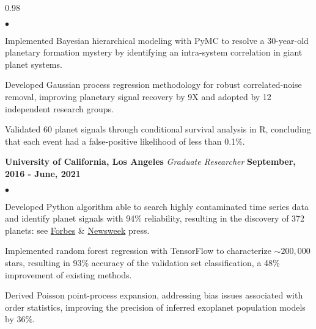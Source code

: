 \documentclass[margin,line, 12pt]{res}
\newenvironment{list2}{
  \begin{list}{$\bullet$}{%
      \setlength{\itemsep}{0.04in}
      \setlength{\parsep}{0.00in} \setlength{\parskip}{0in}
      \setlength{\topsep}{0.0in} \setlength{\partopsep}{0in}
      \setlength{\leftmargin}{0.2in}}}{\end{list}}
\begin{document}
\begin{spacing}{0.98}
\begin{resume}
\begin{list2}
	\item Implemented Bayesian hierarchical modeling with PyMC to resolve a 30-year-old planetary formation mystery by identifying an intra-system correlation in giant planet systems.
	
	\item Developed Gaussian process regression methodology for robust correlated-noise removal, improving planetary signal recovery by 9X and adopted by 12 independent research groups.
	
	\item Validated 60 planet signals through conditional survival analysis in R, concluding that each event had a false-positive likelihood of less than 0.1\%.
	
	


	
	\end{list2}		

\vspace*{-0.08in}
\textbf{University of California, Los Angeles} \newline
\textit{Graduate Researcher} \hfill \textbf{September, 2016 - June, 2021}\newline
	\begin{list2}
		\vspace*{-5mm}
	\item Developed Python algorithm able to search highly contaminated time series data and identify planet signals with 94\% reliability, resulting in the discovery of 372 planets: see \href{https://www.forbes.com/sites/jamiecartereurope/2021/06/11/we-found-372-new-alien-planets-using-a-long-dead-telescope-say-scientists/}{Forbes} \& \href{https://www.newsweek.com/astronomers-discover-366-new-worlds-gas-giants-kepler-k2-exoplanets-nasa-1653254}{Newsweek} press.
	
	\item Implemented random forest regression with TensorFlow to characterize $\sim200,000$ stars, resulting in 93\% accuracy of the validation set classification, a 48\% improvement of existing methods.
	
	
	
	\item Derived Poisson point-process expansion, addressing bias issues associated with order statistics, improving the precision of inferred exoplanet population models by 36\%.
	

\end{list2}
\end{resume}
\end{spacing}
\end{document}
